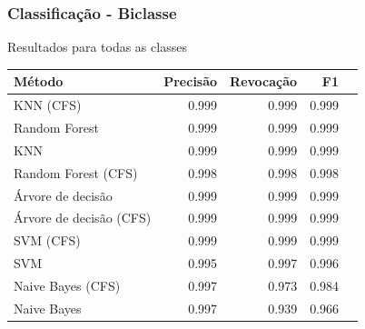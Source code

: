 \documentclass[t]{beamer}
\begin{document}
\begin{frame}[c]
	\frametitle{Classificação - Biclasse}

	\centering
	Resultados para todas as classes

	\small{
		\begin{table}[h]
		\centering
		\begin{tabulary}{\linewidth}{|L|R|R|R|R|}
			\hline
			\textbf{Método} & \textbf{Precisão} & \textbf{Revocação} & \textbf{F1} \\ \hline
			KNN (CFS)               & 0.999 & 0.999 & 0.999 \\ \hline
			Random Forest           & 0.999 & 0.999 & 0.999 \\ \hline
			KNN                     & 0.999 & 0.999 & 0.999 \\ \hline
			Random Forest (CFS)     & 0.998 & 0.998 & 0.998 \\ \hline
			Árvore de decisão       & 0.999 & 0.999 & 0.999 \\ \hline
			Árvore de decisão (CFS) & 0.999 & 0.999 & 0.999 \\ \hline
			SVM (CFS)               & 0.999 & 0.999 & 0.999 \\ \hline
			SVM                     & 0.995 & 0.997 & 0.996 \\ \hline
			Naive Bayes (CFS)       & 0.997 & 0.973 & 0.984 \\ \hline
			Naive Bayes             & 0.997 & 0.939 & 0.966 \\ \hline
		\end{tabulary}
	\end{table}
	}
\end{frame}
\end{document}
